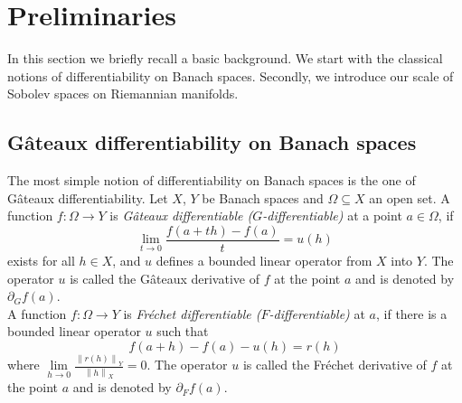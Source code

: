 \documentclass[a4paper,12pt,reqno]{amsart}%
\newcommand{\cal}{\mathcal}
\theoremstyle{definition}
\numberwithin{equation}{section}
\numberwithin{theorem}{section}
\begin{document}





\section[Preliminaries]{Preliminaries}
In this section we briefly recall a basic background. We start with 
 the  classical notions of differentiability on Banach spaces. Secondly, we  introduce our  scale of Sobolev spaces on Riemannian manifolds.
\subsection{G\^ateaux differentiability on Banach spaces}
  The most simple notion of differentiability on Banach spaces is the one of G\^ateaux differentiability. Let $X$, $Y$ be  Banach spaces and $\Omega\subseteq X$ an open set. A function $f:\Omega\rightarrow Y$ is {\it G\^ateaux differentiable ($G$-differentiable)} at a point $a\in\Omega$, if 
\[\lim\limits_{t\rightarrow 0} \frac{f(a+th)-f(a)}{t}=u \left(h\right)\]
exists for all $h\in X$, and $u$ defines  a bounded linear operator from $X$ into $Y$. The operator $u$ is called the G\^{a}teaux derivative of $f$ at the point $a$ and is denoted by $\partial_{G}f(a)$. \\

A function $f:\Omega \rightarrow Y$ is {\it Fr\'echet differentiable ($F$-differentiable)} at $a$, if there is a bounded linear operator $u$ such that
\[f\left(a+h\right)-f\left(a\right)-u\left(h\right)=r\left(h\right)\] where $\lim\limits_{h\rightarrow 0} \frac{\left\|r\left(h\right)\right\|_{Y}}{\left\| h \right\|_{X}}=0$. The operator $u$ is called the Fr\'{e}chet derivative of $f$ at the point $a$  and is denoted by $\partial_{F}f(a)$.\\
\end{document}
